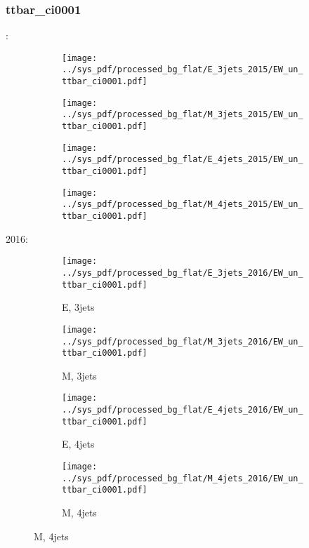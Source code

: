 \documentclass{beamer}
\begin{document}
\begin{frame}
\frametitle{ttbar_ci0001}
\fontsize{5}{1}:
\begin{figure}
\centering
\begin{subfigure}[b]{0.24\textwidth}
\texttt{[image: ../sys\_pdf/processed\_bg\_flat/E\_3jets\_2015/EW\_un\_ttbar\_ci0001.pdf]}
\end{subfigure}
\begin{subfigure}[b]{0.24\textwidth}
\texttt{[image: ../sys\_pdf/processed\_bg\_flat/M\_3jets\_2015/EW\_un\_ttbar\_ci0001.pdf]}
\end{subfigure}
\begin{subfigure}[b]{0.24\textwidth}
\texttt{[image: ../sys\_pdf/processed\_bg\_flat/E\_4jets\_2015/EW\_un\_ttbar\_ci0001.pdf]}
\end{subfigure}
\begin{subfigure}[b]{0.24\textwidth}
\texttt{[image: ../sys\_pdf/processed\_bg\_flat/M\_4jets\_2015/EW\_un\_ttbar\_ci0001.pdf]}
\end{subfigure}
\end{figure}
2016:
\begin{figure}
\centering
\begin{subfigure}[b]{0.24\textwidth}
\texttt{[image: ../sys\_pdf/processed\_bg\_flat/E\_3jets\_2016/EW\_un\_ttbar\_ci0001.pdf]}
\captionsetup{font=tiny}
\caption{E, 3jets}
\end{subfigure}
\begin{subfigure}[b]{0.24\textwidth}
\texttt{[image: ../sys\_pdf/processed\_bg\_flat/M\_3jets\_2016/EW\_un\_ttbar\_ci0001.pdf]}
\captionsetup{font=tiny}
\caption{M, 3jets}
\end{subfigure}
\begin{subfigure}[b]{0.24\textwidth}
\texttt{[image: ../sys\_pdf/processed\_bg\_flat/E\_4jets\_2016/EW\_un\_ttbar\_ci0001.pdf]}
\captionsetup{font=tiny}
\caption{E, 4jets}
\end{subfigure}
\begin{subfigure}[b]{0.24\textwidth}
\texttt{[image: ../sys\_pdf/processed\_bg\_flat/M\_4jets\_2016/EW\_un\_ttbar\_ci0001.pdf]}
\captionsetup{font=tiny}
\caption{M, 4jets}
\end{subfigure}
\end{figure}
\end{frame}
\end{document}
